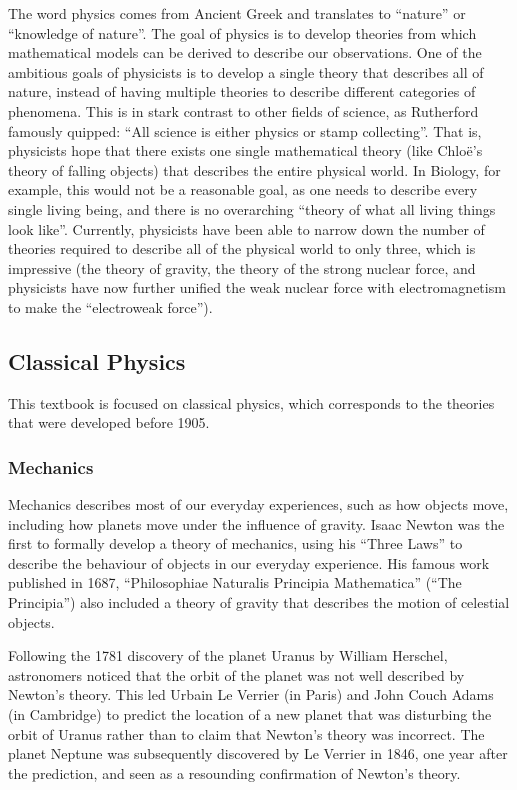 The word physics comes from Ancient Greek and translates to ``nature'' or ``knowledge of nature''. The goal of physics is to develop theories from which mathematical models can be derived to describe our observations. One of the ambitious goals of physicists is to develop a single theory that describes all of nature, instead of having multiple theories to describe different categories of phenomena. This is in stark contrast to other fields of science, as Rutherford famously quipped: ``All science is either physics or stamp collecting''. That is, physicists hope that there exists one single mathematical theory (like Chlo\"e's theory of falling objects) that describes the entire physical world. In Biology, for example, this would not be a reasonable goal, as one needs to describe every single living being, and there is no overarching ``theory of what all living things look like''. Currently, physicists have been able to narrow down the number of theories required to describe all of the physical world to only three, which is impressive (the theory of gravity, the theory of the strong nuclear force, and physicists have now further unified the weak nuclear force with electromagnetism to make the ``electroweak force'').


\subsection{Classical Physics}
This textbook is focused on classical physics, which corresponds to the theories that were developed before 1905.
\subsubsection{Mechanics}
Mechanics describes most of our everyday experiences, such as how objects move, including how planets move under the influence of gravity. Isaac Newton was the first to formally develop a theory of mechanics, using his ``Three Laws'' to describe the behaviour of objects in our everyday experience. His famous work published in 1687, ``Philosophiae Naturalis Principia Mathematica'' (``The Principia'') also included a theory of gravity that describes the motion of celestial objects. 

Following the 1781 discovery of the planet Uranus by William Herschel, astronomers noticed that the orbit of the planet was not well described by Newton's theory. This led Urbain Le Verrier (in Paris) and John Couch Adams (in Cambridge) to predict the location of a new planet that was disturbing the orbit of Uranus rather than to claim that Newton's theory was incorrect. The planet Neptune was subsequently discovered by Le Verrier in 1846, one year after the prediction, and seen as a resounding confirmation of Newton's theory. 

